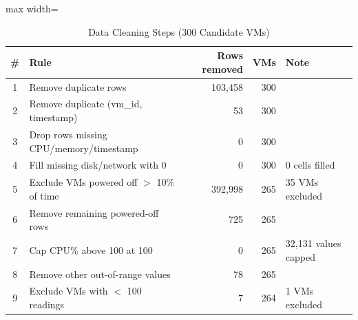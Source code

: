 \begin{table}[!htb]
\centering
\caption{Data Cleaning Steps (300 Candidate VMs)}
\label{tab:cleaning}
\footnotesize
\setlength{\tabcolsep}{4pt}
\begin{adjustbox}{max width=\columnwidth}
\begin{tabular}{cp{3.0cm}rrp{1.55cm}}
\toprule
\# & Rule & Rows removed & VMs & Note \\
\midrule
1 & Remove duplicate rows & 103,458 & 300 &  \\
2 & Remove duplicate (vm\_id, timestamp) & 53 & 300 &  \\
3 & Drop rows missing CPU/memory/timestamp & 0 & 300 &  \\
4 & Fill missing disk/network with 0 & 0 & 300 & 0 cells filled \\
5 & Exclude VMs powered off $>$ 10\% of time & 392,998 & 265 & 35 VMs excluded \\
6 & Remove remaining powered-off rows & 725 & 265 &  \\
7 & Cap CPU\% above 100 at 100 & 0 & 265 & 32,131 values capped \\
8 & Remove other out-of-range values & 78 & 265 &  \\
9 & Exclude VMs with $<$ 100 readings & 7 & 264 & 1 VMs excluded \\
\bottomrule
\end{tabular}
\end{adjustbox}
\end{table}

